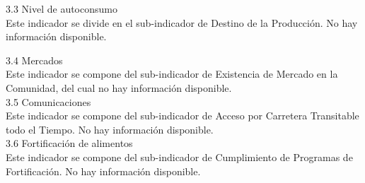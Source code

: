 \newpage
{\Bold\Large 3.3	Nivel de autoconsumo}\\

Este indicador se divide en el sub-indicador de Destino de la Producción. No hay información disponible.

{\Bold\Large 3.4	Mercados}\\

Este indicador se compone del sub-indicador de Existencia de Mercado en la Comunidad, del cual no hay información disponible.\\

{\Bold\Large 3.5	Comunicaciones}\\
Este indicador se compone del sub-indicador de Acceso por Carretera Transitable todo el Tiempo. No hay información disponible.\\

{\Bold\Large 3.6	Fortificación de alimentos}\\

Este indicador se compone del sub-indicador de Cumplimiento de Programas de Fortificación. No hay información disponible.\\
